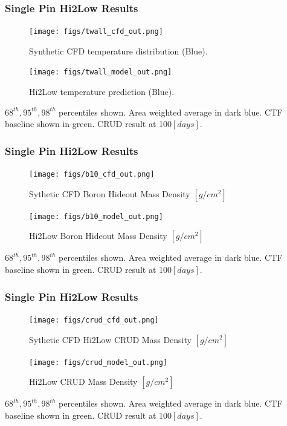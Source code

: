\documentclass[t, pdftex]{beamer}
\begin{document}
\begin{frame}\frametitle{Single Pin Hi2Low Results}
    \begin{figure}
        \centering
        \begin{minipage}{.5\textwidth}
            \centering
            \texttt{[image: figs/twall\_cfd\_out.png]}
            \caption{Synthetic CFD temperature distribution (Blue).}
        \end{minipage}%
        \begin{minipage}{.5\textwidth}
            \centering
            \texttt{[image: figs/twall\_model\_out.png]}
            \caption{Hi2Low temperature prediction (Blue).}
        \end{minipage}
    \end{figure}
$68^{th}, 95^{th}, 98^{th}$ percentiles shown.
Area weighted average in dark blue.  CTF baseline shown in green.  CRUD result at 100$[days]$.
\end{frame}

\begin{frame}\frametitle{Single Pin Hi2Low Results}
    \begin{figure}
        \centering
        \begin{minipage}{.5\textwidth}
            \centering
            \texttt{[image: figs/b10\_cfd\_out.png]}
            \caption{Sythetic CFD Boron Hideout Mass Density $[g/cm^2]$}
        \end{minipage}%
        \begin{minipage}{.5\textwidth}
            \centering
            \texttt{[image: figs/b10\_model\_out.png]}
            \caption{Hi2Low Boron Hideout Mass Density $[g/cm^2]$}
        \end{minipage}
    \end{figure}
$68^{th}, 95^{th}, 98^{th}$ percentiles shown.
Area weighted average in dark blue.  CTF baseline shown in green.  CRUD result at 100$[days]$.
\end{frame}

\begin{frame}\frametitle{Single Pin Hi2Low Results}
    \begin{figure}
        \centering
        \begin{minipage}{.5\textwidth}
            \centering
            \texttt{[image: figs/crud\_cfd\_out.png]}
            \caption{Sythetic CFD Hi2Low CRUD Mass Density $[g/cm^2]$}
        \end{minipage}%
        \begin{minipage}{.5\textwidth}
            \centering
            \texttt{[image: figs/crud\_model\_out.png]}
            \caption{Hi2Low CRUD Mass Density $[g/cm^2]$}
        \end{minipage}
    \end{figure}
$68^{th}, 95^{th}, 98^{th}$ percentiles shown.
Area weighted average in dark blue.  CTF baseline shown in green.  CRUD result at 100$[days]$.
\end{frame}
\end{document}
